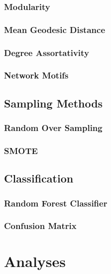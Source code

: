 \documentclass{article}
\begin{document}
		\subsubsection{Modularity}
		\subsubsection{Mean Geodesic Distance}
		\subsubsection{Degree Assortativity}
		\subsubsection{Network Motifs}

	\subsection{Sampling Methods}
		\subsubsection{Random Over Sampling}
		\subsubsection{SMOTE}
	
	\subsection{Classification}
		\subsubsection{Random Forest Classifier}
		\subsubsection{Confusion Matrix}
		\subsubsection{}
		
	\subsection{}

\section{Analyses}
\subsection{}


 
\end{document}
